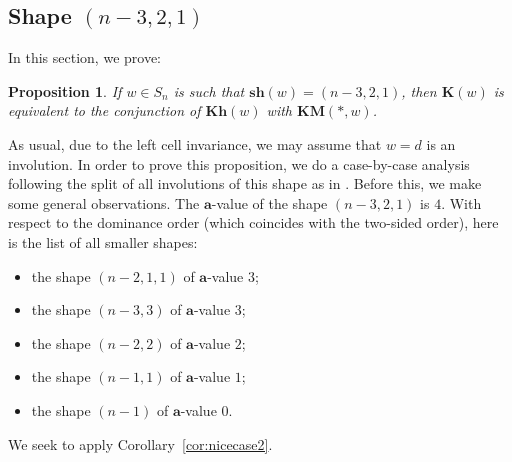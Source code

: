 \documentclass[a4paper]{amsart}
\newtheorem{proposition}[theorem]{Proposition}
\begin{document}
\subsection{Shape $(n-3,2,1)$}\label{s6.2}

In this section, we prove:

\begin{proposition}\label{prop:shape2}
If $w\in S_n$ is such that $\mathbf{sh}(w)=(n-3,2,1)$,
then $\mathbf{K}(w)$ is equivalent to the conjunction of
$\mathbf{Kh}(w)$ with $\mathbf{KM}(*,w)$.
\end{proposition}

As usual, due to the left cell invariance, we may 
assume that $w=d$ is an involution. 
In order to prove this proposition, we do a case-by-case
analysis following the split of all involutions of this
shape as in \cite[Section~5]{CM2}. Before this, we make some
general observations. The $\mathbf{a}$-value of the shape
$(n-3,2,1)$ is $4$. With respect to the dominance order
(which coincides with the two-sided order), here is the
list of all smaller shapes:
\begin{itemize}
\item the shape $(n-2,1,1)$ of $\mathbf{a}$-value $3$;
\item the shape $(n-3,3)$ of $\mathbf{a}$-value $3$;
\item the shape $(n-2,2)$ of $\mathbf{a}$-value $2$;
\item the shape $(n-1,1)$ of $\mathbf{a}$-value $1$;
\item the shape $(n-1)$ of $\mathbf{a}$-value $0$.
\end{itemize}

We seek to apply Corollary~\ref{cor:nicecase2}.

\end{document}
